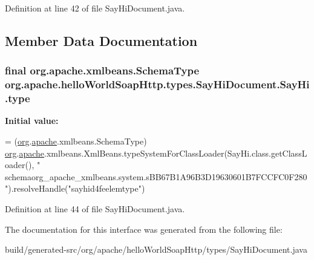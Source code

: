 Definition at line 42 of file Say\+Hi\+Document.\+java.



\subsection{Member Data Documentation}
\hypertarget{interfaceorg_1_1apache_1_1hello_world_soap_http_1_1types_1_1_say_hi_document_1_1_say_hi_a613fd9106b4ae1732151c68a419893f1}{}
\subsubsection[{type}]{\setlength{\rightskip}{0pt plus 5cm}final org.\+apache.\+xmlbeans.\+Schema\+Type org.\+apache.\+hello\+World\+Soap\+Http.\+types.\+Say\+Hi\+Document.\+Say\+Hi.\+type\hspace{0.3cm}{\ttfamily [static]}}\label{interfaceorg_1_1apache_1_1hello_world_soap_http_1_1types_1_1_say_hi_document_1_1_say_hi_a613fd9106b4ae1732151c68a419893f1}
{\bfseries Initial value\+:}
\begin{DoxyCode}
= (\hyperlink{namespaceorg}{org}.\hyperlink{namespaceorg_1_1apache}{apache}.xmlbeans.SchemaType)
            \hyperlink{namespaceorg}{org}.\hyperlink{namespaceorg_1_1apache}{apache}.xmlbeans.XmlBeans.typeSystemForClassLoader(SayHi.class.getClassLoader(), \textcolor{stringliteral}{"
      schemaorg\_apache\_xmlbeans.system.sBB67B1A96B3D19630601B7FCCFC0F280"}).resolveHandle(\textcolor{stringliteral}{"sayhid4feelemtype"})
\end{DoxyCode}


Definition at line 44 of file Say\+Hi\+Document.\+java.



The documentation for this interface was generated from the following file\+:\begin{DoxyCompactItemize}
\item 
build/generated-\/src/org/apache/hello\+World\+Soap\+Http/types/Say\+Hi\+Document.\+java\end{DoxyCompactItemize}
